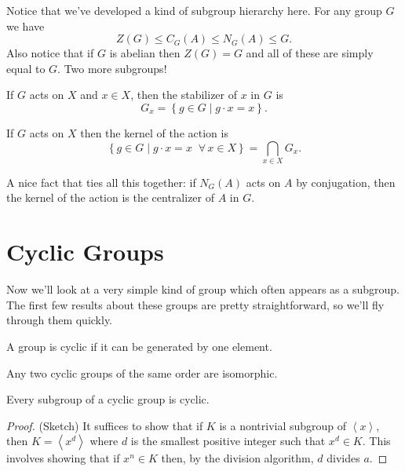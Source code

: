 \documentclass[../m171main.tex]{subfiles}
\begin{document}
Notice that we've developed a kind of subgroup hierarchy here.
For any group $G$ we have
\[ Z(G) \leq C_G(A) \leq N_G(A) \leq G. \]
Also notice that if $G$ is abelian then $Z(G) = G$ and all of these are simply equal to $G$.
Two more subgroups!

\begin{definition}[Stabilizer]
    If $G$ acts on $X$ and $x \in X$, then the stabilizer of $x$ in $G$ is
    \[ G_x = \left\{ g \in G \mid g \cdot x = x \right\}. \]
\end{definition}

\begin{definition}[Kernel]
    If $G$ acts on $X$ then the kernel of the action is
    \[ \left\{ g \in G \mid g \cdot x = x \;\;\forall\, x \in X \right\} = \bigcap_{x \in X} G_x. \]
\end{definition}

A nice fact that ties all this together: if $N_G(A)$ acts on $A$ by conjugation, then the kernel of the action is the centralizer of $A$ in $G$.

\section{Cyclic Groups}
Now we'll look at a very simple kind of group which often appears as a subgroup.
The first few results about these groups are pretty straightforward, so we'll fly through them quickly.

\begin{definition}
    A group is cyclic if it can be generated by one element.
\end{definition}

\begin{theorem}[]
    Any two cyclic groups of the same order are isomorphic.
\end{theorem}

\begin{theorem}
    Every subgroup of a cyclic group is cyclic.
\end{theorem}

\begin{proof}
    (Sketch) It suffices to show that if $K$ is a nontrivial subgroup of $\left< x \right>$, then $K = \left< x^{d} \right>$ where $d$ is the smallest positive integer such that $x^{d} \in K$.
    This involves showing that if $x^{n} \in K$ then, by the division algorithm, $d$ divides $a$.
\end{proof}
\end{document}
